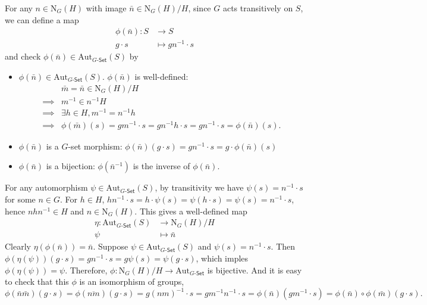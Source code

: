 \begin{prf}
    For any $n \in \mathrm{N}_G(H)$ with image $\bar{n} \in \mathrm{N}_G(H)/H$, since $G$ acts transitively on $S$, we can define a map
    \begin{align*}
        \phi(\bar{n}):S & \longrightarrow S          \\
        g\cdot s        & \longmapsto gn^{-1}\cdot s
    \end{align*}
    and check $\phi(\bar{n})\in\mathrm{Aut}_{G\text{-}\mathsf{Set}}(S)$ by
    \begin{itemize}
        \item $\phi(\bar{n})\in\mathrm{Aut}_{G\text{-}\mathsf{Set}}(S)$. $\phi(\bar{n})$ is well-defined:
              \begin{align*}
                           & \bar{m}=\bar{n}\in\mathrm{N}_G(H)/H                                              \\
                  \implies & m^{-1}\in n^{-1}H                                                                \\
                  \implies & \exists h\in H,m^{-1}=n^{-1}h                                                    \\
                  \implies & \phi(\bar{m})(s)=gm^{-1}\cdot s=gn^{-1}h\cdot s=gn^{-1}\cdot s=\phi(\bar{n})(s).
              \end{align*}
        \item $\phi(\bar{n})$ is a $G$-set morphism: $\phi(\bar{n})(g\cdot s)=gn^{-1}\cdot s=g\cdot\phi(\bar{n})(s)$
        \item $\phi(\bar{n})$ is a bijection: $\phi(\bar{n}^{-1})$ is the inverse of $\phi(\bar{n})$.
    \end{itemize}
    For any automorphism $\psi\in \mathrm{Aut}_{G\text{-}\mathsf{Set}}(S)$, by transitivity we have $\psi(s)=n^{-1}\cdot s$ for some $n \in G$. For $h \in H$, $hn^{-1}\cdot s=h\cdot\psi(s)=\psi(h\cdot s)=\psi(s)=n^{-1}\cdot s$, hence $n h n^{-1} \in H$ and $n \in \mathrm{N}_G(H)$. This gives a well-defined map
    \begin{align*}
        \eta:\mathrm{Aut}_{G\text{-}\mathsf{Set}}(S) & \longrightarrow \mathrm{N}_G(H)/H \\
        \psi                                         & \longmapsto \bar{n}
    \end{align*}
    Clearly $\eta(\phi(\bar{n}))=\bar{n}$. Suppose $\psi\in\mathrm{Aut}_{G\text{-}\mathsf{Set}}(S)$ and $\psi(s)=n^{-1}\cdot s$. Then $\phi(\eta(\psi))(g\cdot s)=g n^{-1}\cdot s=g\psi(s)=\psi(g\cdot s)$, which imples $\phi(\eta(\psi))=\psi$. Therefore, $\phi:\mathrm{N}_G(H)/H\to\mathrm{Aut}_{G\text{-}\mathsf{Set}}$ is bijective. And it is easy to check that this $\phi$ is an isomorphism of groups,
    \[
        \phi(\bar{n}\bar{m})(g\cdot s)=\phi(\overline{nm})(g\cdot s)=g(nm)^{-1}\cdot s=gm^{-1}n^{-1}\cdot s=\phi(\bar{n})(gm^{-1}\cdot s)=\phi(\bar{n})\circ\phi(\bar{m})(g\cdot s).
    \]
\end{prf}



